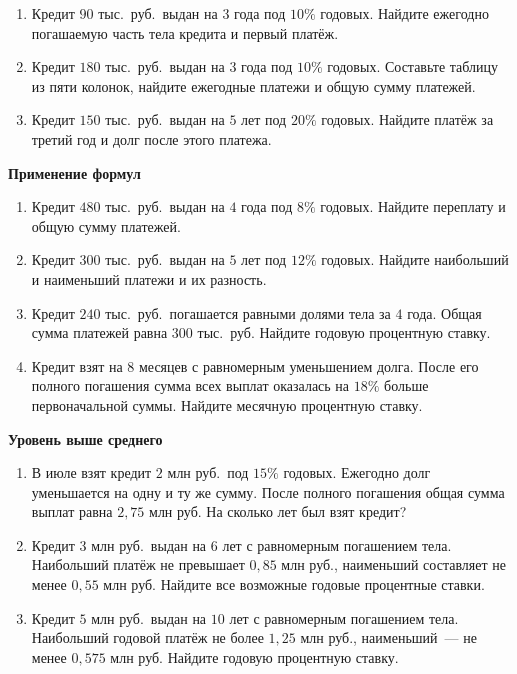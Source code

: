 \documentclass[a4paper,12pt]{article}
\begin{document}
\begin{enumerate}[label=\textbf{\arabic*.},leftmargin=8mm,itemsep=7pt]
\item Кредит $90$ тыс.\ руб.\ выдан на $3$ года под $10\%$ годовых.
Найдите ежегодно погашаемую часть тела кредита и первый платёж.

\item Кредит $180$ тыс.\ руб.\ выдан на $3$ года под $10\%$
годовых. Составьте таблицу из пяти колонок, найдите ежегодные
платежи и общую сумму платежей.

\item Кредит $150$ тыс.\ руб.\ выдан на $5$ лет под $20\%$
годовых. Найдите платёж за третий год и долг после этого платежа.
\end{enumerate}

\textcolor{darkaccent}{\textbf{Применение формул}}

\begin{enumerate}[label=\textbf{\arabic*.},start=4,leftmargin=8mm,itemsep=7pt]
\item Кредит $480$ тыс.\ руб.\ выдан на $4$ года под $8\%$
годовых. Найдите переплату и общую сумму платежей.

\item Кредит $300$ тыс.\ руб.\ выдан на $5$ лет под $12\%$
годовых. Найдите наибольший и наименьший платежи и их разность.

\item Кредит $240$ тыс.\ руб.\ погашается равными долями тела за
$4$ года. Общая сумма платежей равна $300$ тыс.\ руб.
Найдите годовую процентную ставку.

\item Кредит взят на $8$ месяцев с равномерным уменьшением долга.
После его полного погашения сумма всех выплат оказалась на $18\%$
больше первоначальной суммы. Найдите месячную процентную ставку.
\end{enumerate}

\textcolor{darkaccent}{\textbf{Уровень выше среднего}}

\begin{enumerate}[label=\textbf{\arabic*.},start=8,leftmargin=8mm,itemsep=7pt]
\item В июле взят кредит $2$ млн руб.\ под $15\%$ годовых.
Ежегодно долг уменьшается на одну и ту же сумму.
После полного погашения общая сумма выплат равна $2{,}75$ млн руб.
На сколько лет был взят кредит?

\item Кредит $3$ млн руб.\ выдан на $6$ лет с равномерным
погашением тела. Наибольший платёж не превышает $0{,}85$ млн руб.,
наименьший составляет не менее $0{,}55$ млн руб.
Найдите все возможные годовые процентные ставки.

\item Кредит $5$ млн руб.\ выдан на $10$ лет с равномерным
погашением тела. Наибольший годовой платёж не более $1{,}25$ млн руб.,
наименьший~--- не менее $0{,}575$ млн руб.
Найдите годовую процентную ставку.
\end{enumerate}
\end{document}
